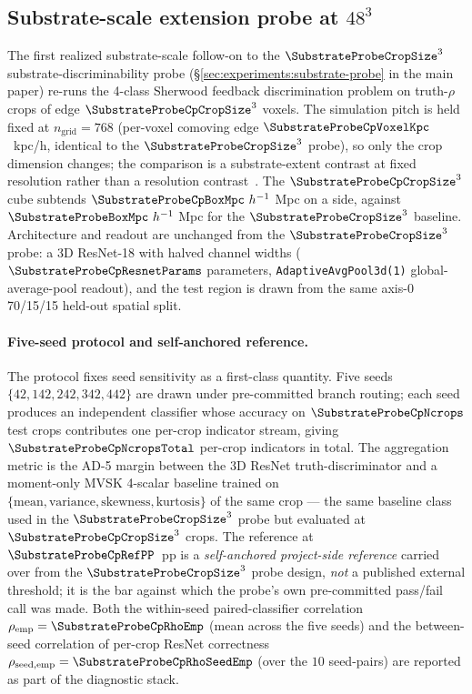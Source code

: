 \subsection{Substrate-scale extension probe at $48^3$}
\label{sec:suppl:exp:substrate-probe-cprime}
The first realized substrate-scale follow-on to the $\SubstrateProbeCropSize^3$ substrate-discriminability probe (\S\ref{sec:experiments:substrate-probe} in the main paper) re-runs the 4-class Sherwood feedback discrimination problem on truth-$\rho$ crops of edge $\SubstrateProbeCpCropSize^3$ voxels. The simulation pitch is held fixed at $n_{\text{grid}}=768$ (per-voxel comoving edge $\SubstrateProbeCpVoxelKpc$~kpc/h, identical to the $\SubstrateProbeCropSize^3$ probe), so only the crop dimension changes; the comparison is a substrate-extent contrast at fixed resolution rather than a resolution contrast~\cite{touvron2019fixres}. The $\SubstrateProbeCpCropSize^3$ cube subtends $\SubstrateProbeCpBoxMpc~h^{-1}$ Mpc on a side, against $\SubstrateProbeBoxMpc~h^{-1}$ Mpc for the $\SubstrateProbeCropSize^3$ baseline. Architecture and readout are unchanged from the $\SubstrateProbeCropSize^3$ probe: a 3D ResNet-18 with halved channel widths ($\SubstrateProbeCpResnetParams$ parameters, \texttt{AdaptiveAvgPool3d(1)} global-average-pool readout), and the test region is drawn from the same axis-0 70/15/15 held-out spatial split.

\paragraph{Five-seed protocol and self-anchored reference.}
The protocol fixes seed sensitivity as a first-class quantity. Five seeds $\{42, 142, 242, 342, 442\}$ are drawn under pre-committed branch routing; each seed produces an independent classifier whose accuracy on $\SubstrateProbeCpNcrops$ test crops contributes one per-crop indicator stream, giving $\SubstrateProbeCpNcropsTotal$ per-crop indicators in total. The aggregation metric is the AD-5 margin between the 3D ResNet truth-discriminator and a moment-only MVSK 4-scalar baseline trained on $\{\text{mean}, \text{variance}, \text{skewness}, \text{kurtosis}\}$ of the same crop --- the same baseline class used in the $\SubstrateProbeCropSize^3$ probe but evaluated at $\SubstrateProbeCpCropSize^3$ crops. The reference at $\SubstrateProbeCpRefPP$~pp is a \emph{self-anchored project-side reference} carried over from the $\SubstrateProbeCropSize^3$ probe design, \emph{not} a published external threshold; it is the bar against which the probe's own pre-committed pass/fail call was made. Both the within-seed paired-classifier correlation $\rho_{\text{emp}}=\SubstrateProbeCpRhoEmp$ (mean across the five seeds) and the between-seed correlation of per-crop ResNet correctness $\rho_{\text{seed,emp}}=\SubstrateProbeCpRhoSeedEmp$ (over the $10$ seed-pairs) are reported as part of the diagnostic stack.

